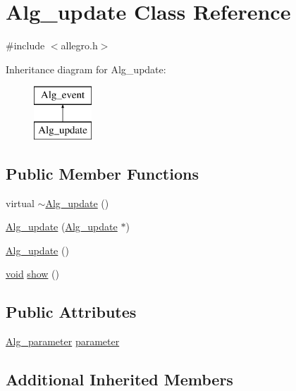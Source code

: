 \hypertarget{class_alg__update}{}\section{Alg\+\_\+update Class Reference}
\label{class_alg__update}


{\ttfamily \#include $<$allegro.\+h$>$}

Inheritance diagram for Alg\+\_\+update\+:\begin{figure}[H]
\begin{center}
\leavevmode
\includegraphics[height=2.000000cm]{class_alg__update}
\end{center}
\end{figure}
\subsection*{Public Member Functions}
\begin{DoxyCompactItemize}
\item 
virtual \hyperlink{class_alg__update_aec9b88a47d691e655e1f2c305419383a}{$\sim$\+Alg\+\_\+update} ()
\item 
\hyperlink{class_alg__update_a299d33319ecdde544f68a7507c64937d}{Alg\+\_\+update} (\hyperlink{class_alg__update}{Alg\+\_\+update} $\ast$)
\item 
\hyperlink{class_alg__update_a5e5b96b9f8ae820d93e7a3279fddcea2}{Alg\+\_\+update} ()
\item 
\hyperlink{sound_8c_ae35f5844602719cf66324f4de2a658b3}{void} \hyperlink{class_alg__update_ae0f9071d97a94ee6f862d0b511b15f1d}{show} ()
\end{DoxyCompactItemize}
\subsection*{Public Attributes}
\begin{DoxyCompactItemize}
\item 
\hyperlink{class_alg__parameter}{Alg\+\_\+parameter} \hyperlink{class_alg__update_a81fb0f4844e921b7073b2831cf7b93f8}{parameter}
\end{DoxyCompactItemize}
\subsection*{Additional Inherited Members}


